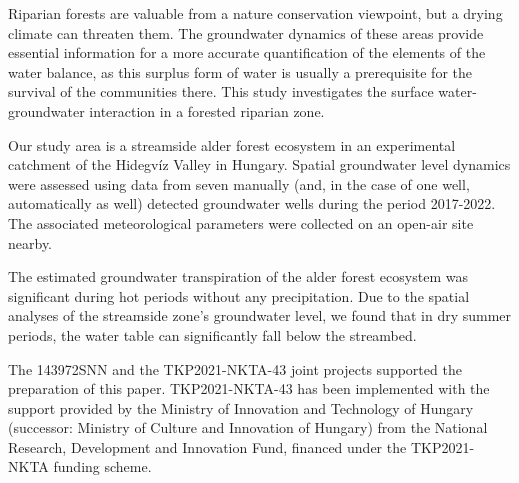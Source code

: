 

\newpage{}
{}
\begin{flushleft}





\end{flushleft}

\noindent

Riparian forests are valuable from a nature conservation viewpoint, but a drying climate can threaten them. The groundwater dynamics of these areas provide essential information for a more accurate quantification of the elements of the water balance, as this surplus form of water is usually a prerequisite for the survival of the communities there. This study investigates the surface water-groundwater interaction in a forested riparian zone.

Our study area is a streamside alder forest ecosystem in an experimental catchment of the Hidegvíz Valley in Hungary. Spatial groundwater level dynamics were assessed using data from seven manually (and, in the case of one well, automatically as well) detected groundwater wells during the period 2017-2022. The associated meteorological parameters were collected on an open-air site nearby.

The estimated groundwater transpiration of the alder forest ecosystem was significant during hot periods without any precipitation. Due to the spatial analyses of the streamside zone’s groundwater level, we found that in dry summer periods, the water table can significantly fall below the streambed.

The 143972SNN and the TKP2021-NKTA-43 joint projects supported the preparation of this paper. TKP2021-NKTA-43 has been implemented with the support provided by the Ministry of Innovation and Technology of Hungary (successor: Ministry of Culture and Innovation of Hungary) from the National Research, Development and Innovation Fund, financed under the TKP2021-NKTA funding scheme.


